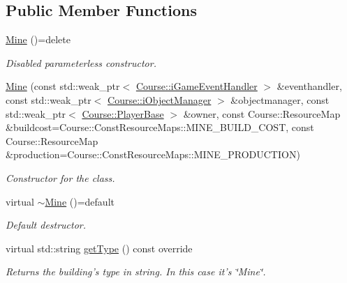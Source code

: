 \subsection*{Public Member Functions}
\begin{DoxyCompactItemize}
\item 
\hypertarget{class_student_1_1_mine_a7df6440015dcfbdd8abed029134f7af1}{\hyperlink{class_student_1_1_mine_a7df6440015dcfbdd8abed029134f7af1}{Mine} ()=delete}\label{class_student_1_1_mine_a7df6440015dcfbdd8abed029134f7af1}

\begin{DoxyCompactList}\small\item\em Disabled parameterless constructor. \end{DoxyCompactList}\item 
\hyperlink{class_student_1_1_mine_aa9dd9b720fd2a91c77cec630fbb2d5d7}{Mine} (const std\-::weak\-\_\-ptr$<$ \hyperlink{class_course_1_1i_game_event_handler}{Course\-::i\-Game\-Event\-Handler} $>$ \&eventhandler, const std\-::weak\-\_\-ptr$<$ \hyperlink{class_course_1_1i_object_manager}{Course\-::i\-Object\-Manager} $>$ \&objectmanager, const std\-::weak\-\_\-ptr$<$ \hyperlink{class_course_1_1_player_base}{Course\-::\-Player\-Base} $>$ \&owner, const Course\-::\-Resource\-Map \&buildcost=Course\-::\-Const\-Resource\-Maps\-::\-M\-I\-N\-E\-\_\-\-B\-U\-I\-L\-D\-\_\-\-C\-O\-S\-T, const Course\-::\-Resource\-Map \&production=Course\-::\-Const\-Resource\-Maps\-::\-M\-I\-N\-E\-\_\-\-P\-R\-O\-D\-U\-C\-T\-I\-O\-N)
\begin{DoxyCompactList}\small\item\em Constructor for the class. \end{DoxyCompactList}\item 
\hypertarget{class_student_1_1_mine_a8385991befd39d5c41d2800d3c081c1b}{virtual \hyperlink{class_student_1_1_mine_a8385991befd39d5c41d2800d3c081c1b}{$\sim$\-Mine} ()=default}\label{class_student_1_1_mine_a8385991befd39d5c41d2800d3c081c1b}

\begin{DoxyCompactList}\small\item\em Default destructor. \end{DoxyCompactList}\item 
virtual std\-::string \hyperlink{class_student_1_1_mine_aa317adabe862ce41077d712d5b4cdf98}{get\-Type} () const override
\begin{DoxyCompactList}\small\item\em Returns the building's type in string. In this case it's \char`\"{}\-Mine\char`\"{}. \end{DoxyCompactList}\end{DoxyCompactItemize}
